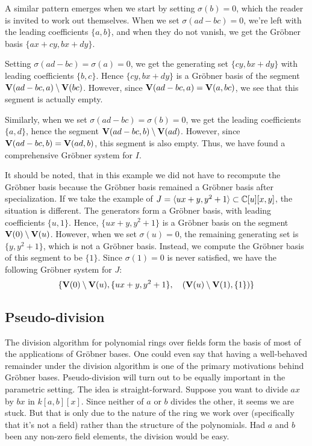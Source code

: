 \begin{example}
  A similar pattern emerges when we start by setting $\sigma(b) = 0$, which the reader is invited to work out themselves. When we set $\sigma(ad - bc) = 0$, we're left with the leading coefficients $\{a, b\}$, and when they do not vanish, we get the Gröbner basis $\{ax + cy, bx + dy\}$.

  Setting $\sigma(ad - bc) = \sigma(a) = 0$, we get the generating set $\{cy, bx + dy\}$ with leading coefficients $\{b, c\}$. Hence $\{cy, bx + dy\}$ is a Gröbner basis of the segment $\operatorname{\mathbf V}(ad - bc, a) \setminus \operatorname{\mathbf V}(bc)$. However, since $\operatorname{\mathbf V}(ad - bc, a) = \operatorname{\mathbf V}(a, bc)$, we see that this segment is actually empty.

  Similarly, when we set $\sigma(ad - bc) = \sigma(b) = 0$, we get the leading coefficients $\{a, d\}$, hence the segment $\operatorname{\mathbf V}(ad - bc, b) \setminus \operatorname{\mathbf V}(ad)$. However, since $\operatorname{\mathbf V}(ad - bc, b) = \operatorname{\mathbf V}(ad, b)$, this segment is also empty. Thus, we have found a comprehensive Gröbner system for $I$.

  It should be noted, that in this example we did not have to recompute the Gröbner basis because the Gröbner basis remained a Gröbner basis after specialization. If we take the example of $J = \langle ux + y, y^{2} + 1 \rangle \subset \mathbb{C}[u][x, y]$, the situation is different. The generators form a Gröbner basis, with leading coefficients $\{u, 1\}$. Hence, $\{ux + y, y^{2} + 1\}$ is a Gröbner basis on the segment $\operatorname{\mathbf V}(0) \setminus \operatorname{\mathbf V}(u)$. However, when we set $\sigma(u) = 0$, the remaining generating set is $\{y, y^{2} + 1\}$, which is not a Gröbner basis. Instead, we compute the Gröbner basis of this segment to be $\{1\}$. Since $\sigma(1) = 0$ is never satisfied, we have the following Gröbner system for $J$:
  \[\{\operatorname{\mathbf V}(0) \setminus \operatorname{\mathbf V}(u), \{ux + y, y^{2} + 1\}, \quad (\operatorname{\mathbf V}(u) \setminus \operatorname{\mathbf V}(1), \{1\})\}\]
\end{example}


\subsection{Pseudo-division}
The division algorithm for polynomial rings over fields form the basis of most of the applications of Gröbner bases. One could even say that having a well-behaved remainder under the division algorithm is one of the primary motivations behind Gröbner bases. Pseudo-division will turn out to be equally important in the parametric setting. The idea is straight-forward. Suppose you want to divide $ax$ by $bx$ in $k[a, b][x]$. Since neither of $a$ or $b$ divides the other, it seems we are stuck. But that is only due to the nature of the ring we work over (specifically that it's not a field) rather than the structure of the polynomials. Had $a$ and $b$ been any non-zero field elements, the division would be easy.

